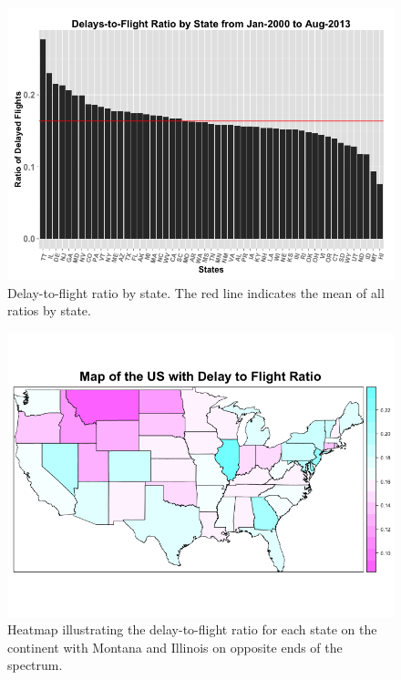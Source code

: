 \documentclass[11pt,twoside,titlepage]{article}
\begin{document}
\begin{figure}[h!]
        \centering
                \includegraphics[width=17cm]{Delays_by_State2.png}
        \caption{Delay-to-flight ratio by state. The red line indicates the mean of all ratios by state.}\label{fig:Delays by State as Percentage}
\end{figure}

\begin{figure}[h!]
        \centering
                \includegraphics[width=14cm]{USMap2.png}
        \caption{Heatmap illustrating the delay-to-flight ratio for each state on the continent with Montana and Illinois on opposite ends of the spectrum.}\label{fig:USMap2}
\end{figure}
\end{document}
